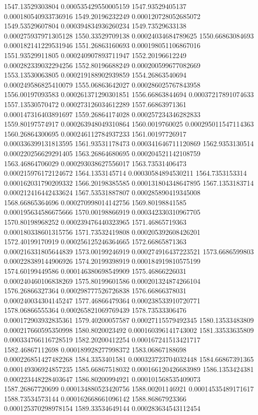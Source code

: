 {1547.13529303804 0.000535429550005159
1547.93529405137 0.000180540933736916
1549.20196232249 0.000120728052685072
1549.53529607804 0.000394834936260234
1549.73529633138 0.000275937971305128
1550.33529709138 0.00024034684789625
1550.66863084693 0.000182141229531946
1551.26863160693 0.000198051106867016
1551.93529911805 0.000240907893711947
1552.20196612249 0.000282339032294256
1552.80196688249 0.000200599677082669
1553.13530063805 0.000219188902939859
1554.26863540694 0.000249586825410079
1555.06863642027 0.000286025767843958
1556.00197093583 0.000261371290301851
1556.66863844694 0.00037217891074633
1557.13530570472 0.000273126034612289
1557.66863971361 0.000147316403891697
1559.26864174028 0.000257234346282833
1559.80197574917 0.000263948049310864
1560.0019760025 0.000295011547114363
1560.26864300695 0.000246112784937233
1561.00197726917 0.000336399131813595
1561.93531178473 0.000341646711120869
1562.9353130514 0.000220256629291405
1563.26864680695 0.000204521142108759
1563.46864706029 0.000293038627556017
1563.73531406473 0.000215976172124672
1564.1353145714 0.00030584894530211
1564.7353153314 0.000162031790209332
1566.20198385585 0.000131804348647895
1567.1353183714 0.000212416442433624
1567.53531887807 0.000285890419345008
1568.66865364696 0.000270998014142756
1569.80198841585 0.000195634586675666
1570.00198866919 0.000342330310967705
1570.80198968252 0.000239476440323965
1571.46865719363 0.000180338601315756
1571.73532419808 0.000205392608426201
1572.40199170919 0.000256125246364665
1572.66865871363 0.000216331805644839
1573.00199246919 0.000274916437223521
1573.6686599803 0.000228389144906926
1574.20199398919 0.000184919810575199
1574.60199449586 0.000146380698549909
1575.46866226031 0.000240460106838269
1575.80199601586 0.000201324874266104
1576.26866327364 0.000298777526726838
1576.66866378031 0.000240034304145247
1577.46866479364 0.000238533910720771
1578.06866555364 0.000265821069769439
1578.73533306476 0.000172903932835361
1579.40200057587 0.00027115579492345
1580.13533483809 0.000217660595350998
1580.8020023492 0.000160396141743002
1581.33533635809 0.000334766116728519
1582.20200412254 0.000167241513421717
1582.46867112698 0.000189928277998372
1583.06867188698 0.000226851427482268
1584.3353401581 0.000323723704032448
1584.66867391365 0.000149306924857235
1585.66867518032 0.000166120426683989
1586.1353424381 0.000223448228403647
1586.80200994921 0.000101568535409073
1587.26867720699 0.000134880523420756
1588.00201146921 0.00014535489171617
1588.73534573144 0.000162668661096142
1588.86867923366 0.000125370298978154
1589.33534649144 0.000283634543112454
}
